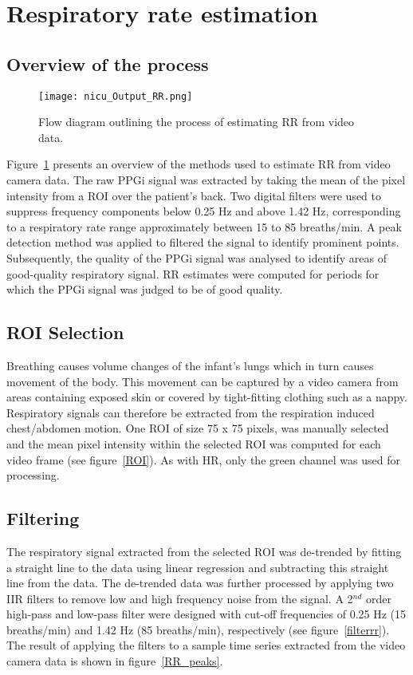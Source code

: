 \section{Respiratory rate estimation}
\subsection{Overview of the process}
    \label{sec:camera_rr_est_overview} 
\begin{center}
\begin{figure}[H]
    \centering
\texttt{[image: nicu\_Output\_RR.png]}
    \caption{Flow diagram outlining the process of estimating RR from video data.}
    \label{fig:camera_rr_est_overview}
\end{figure}
\end{center}

Figure~\ref{fig:camera_rr_est_overview} presents an overview of the methods used to estimate RR from video camera data. The raw PPGi signal was extracted by taking the mean of the pixel intensity from a ROI over the patient's back. Two digital filters were used to suppress frequency components below 0.25 Hz and above 1.42 Hz, corresponding to a respiratory rate range approximately between 15 to 85 breaths/min. A peak detection method was applied to filtered the signal to identify prominent points. Subsequently, the quality of the PPGi signal was analysed to identify areas of good-quality respiratory signal. RR estimates were computed for periods for which the PPGi signal was judged to be of good quality.

\subsection{ROI Selection}
\label{roirr}
Breathing causes volume changes of the infant's lungs which in turn causes movement of the body. This movement can be captured by a video camera from areas containing exposed skin or covered by tight-fitting clothing such as a nappy. Respiratory signals can therefore be extracted from the respiration induced chest/abdomen motion. One ROI of size 75 x 75 pixels, was manually selected and the mean pixel intensity within the selected ROI was computed for each video frame (see figure~\ref{ROI}). As with HR, only the green channel was used for processing.
 
\subsection{Filtering}
\label{filteringrr}
The respiratory signal extracted from the selected ROI was de-trended by fitting a straight line to the data using linear regression and subtracting this straight line from the data. The de-trended data was further processed by applying two IIR filters  to remove low and high frequency noise from the signal. A 2$^{nd}$ order high-pass and low-pass filter were designed with cut-off frequencies of 0.25 Hz (15 breaths/min) and 1.42 Hz (85 breaths/min), respectively (see figure~\ref{filterrr}). The result of applying the filters to a sample time series extracted from the video camera data is shown in figure~\ref{RR_peaks}.

